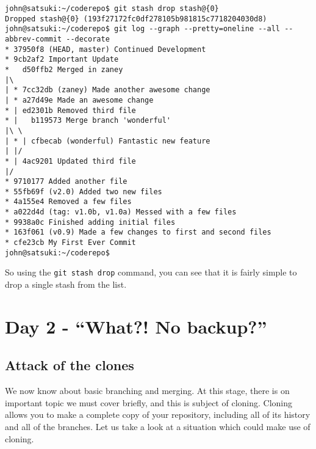 \begin{Verbatim}[frame=leftline,framerule=1mm,fontsize=\relsize{-3}] 
john@satsuki:~/coderepo$ git stash drop stash@{0}
Dropped stash@{0} (193f27172fc0df278105b981815c7718204030d8)
john@satsuki:~/coderepo$ git log --graph --pretty=oneline --all --abbrev-commit --decorate
* 37950f8 (HEAD, master) Continued Development
* 9cb2af2 Important Update
*   d50ffb2 Merged in zaney
|\  
| * 7cc32db (zaney) Made another awesome change
| * a27d49e Made an awesome change
* | ed2301b Removed third file
* |   b119573 Merge branch 'wonderful'
|\ \  
| * | cfbecab (wonderful) Fantastic new feature
| |/  
* | 4ac9201 Updated third file
|/  
* 9710177 Added another file
* 55fb69f (v2.0) Added two new files
* 4a155e4 Removed a few files
* a022d4d (tag: v1.0b, v1.0a) Messed with a few files
* 9938a0c Finished adding initial files
* 163f061 (v0.9) Made a few changes to first and second files
* cfe23cb My First Ever Commit
john@satsuki:~/coderepo$ 
\end{Verbatim}

So using the \texttt{git stash drop} command, you can see that it is fairly simple to drop a single stash from the list.


\section{Day 2 - ``What?! No backup?''}
\subsection{Attack of the clones}

We now know about basic branching and merging.  At this stage, there is on important topic we must cover briefly, and this is subject of cloning.  Cloning allows you to make a complete copy of your repository, including all of its history and all of the branches.  Let us take a look at a situation which could make use of cloning.

